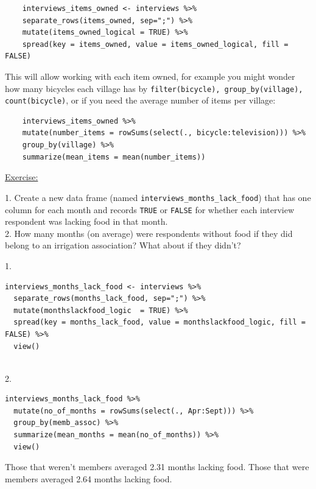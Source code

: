 \documentclass[12pt]{article}
\begin{document}
\begin{verbatim}
    interviews_items_owned <- interviews %>%
    separate_rows(items_owned, sep=";") %>%
    mutate(items_owned_logical = TRUE) %>%
    spread(key = items_owned, value = items_owned_logical, fill = FALSE)
\end{verbatim}
This will allow working with each item owned, for example you might wonder how many bicycles each village has by \texttt{filter(bicycle), group\_by(village), count(bicycle)}, or if you need the average number of items per village:
\begin{verbatim}
    interviews_items_owned %>%
    mutate(number_items = rowSums(select(., bicycle:television))) %>%
    group_by(village) %>%
    summarize(mean_items = mean(number_items))
\end{verbatim}
\vspace{0.5em}
\begin{addmargin}[1cm]{0cm}
\color{gray}
\underline{Exercise:}

1. Create a new data frame (named \texttt{interviews_months_lack_food}) that has one column for each month and records \texttt{TRUE} or \texttt{FALSE} for whether each interview respondent was lacking food in that month.
\\2. How many months (on average) were respondents without food if they did belong to an irrigation association? What about if they didn’t?

\color{black}\vspace{0.5em}

1. \begin{verbatim}
interviews_months_lack_food <- interviews %>%
  separate_rows(months_lack_food, sep=";") %>%
  mutate(monthslackfood_logic  = TRUE) %>%
  spread(key = months_lack_food, value = monthslackfood_logic, fill = FALSE) %>%
  view()
\end{verbatim} 
\\2. \begin{verbatim}
interviews_months_lack_food %>%
  mutate(no_of_months = rowSums(select(., Apr:Sept))) %>%
  group_by(memb_assoc) %>%
  summarize(mean_months = mean(no_of_months)) %>%
  view()
\end{verbatim}
Those that weren't members averaged 2.31 months lacking food. Those that were members averaged 2.64 months lacking food.
\end{addmargin}

\newpage
\end{document}
